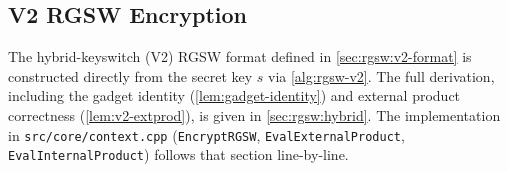 \subsection{V2 RGSW Encryption}
\label{sec:impl:rgsw-v2}

The hybrid-keyswitch (V2) RGSW format defined in \autoref{sec:rgsw:v2-format} is constructed directly from the secret key $s$ via \autoref{alg:rgsw-v2}. The full derivation, including the gadget identity (\autoref{lem:gadget-identity}) and external product correctness (\autoref{lem:v2-extprod}), is given in \autoref{sec:rgsw:hybrid}. The implementation in \texttt{src/core/context.cpp} (\texttt{EncryptRGSW}, \texttt{EvalExternalProduct}, \texttt{EvalInternalProduct}) follows that section line-by-line.
